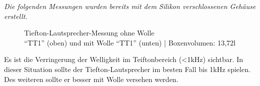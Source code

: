 \newpage
\textit{Die folgenden Messungen wurden bereits mit dem Silikon verschlossenen Gehäuse erstellt.}\\
\begin{figure} [H]
	\centering
	\quad
	\caption{Tiefton-Lautsprecher-Messung ohne Wolle\\ \enquote{TT1} (oben) und mit Wolle \enquote{TT1} (unten) | Boxenvolumen: 13,72l}
	\label{fig:4.2.4.1}
\end{figure}
Es ist die Verringerung der Welligkeit im Teiftonbereich (<1kHz) sichtbar.
In dieser Situation sollte der Tiefton-Lautsprecher im besten Fall bis 1kHz spielen.
Des weiteren sollte er besser mit Wolle versehen werden.

